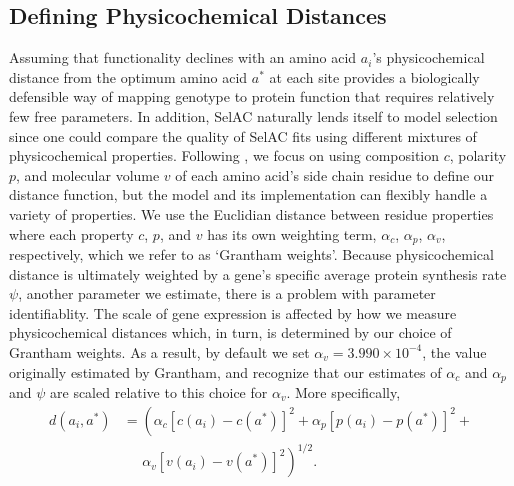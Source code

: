 \documentclass[onecolumn,letterpaper,fleqn,nogrid]{myMBE}%
\newcommand{\selac}{SelAC\xspace}
\newcommand{\alphac}{\ensuremath{\alpha_c}\xspace}
\newcommand{\alphap}{\ensuremath{\alpha_p}\xspace}
\newcommand{\alphav}{\ensuremath{\alpha_v}\xspace}
\newcommand{\aopt}{\ensuremath{a^*}\xspace}
\begin{document}
\subsection{Defining Physicochemical Distances}
Assuming that functionality declines with an amino acid $a_i$'s physicochemical distance from the optimum amino acid \aopt at each site provides a biologically defensible way of mapping genotype to protein function that requires relatively few free parameters.
In addition, \selac naturally lends itself to model selection since one could compare the quality of \selac fits using different mixtures of physicochemical properties.
Following \cite{Grantham1974}, we focus on using composition $c$, polarity $p$, and molecular volume $v$ of each amino acid's side chain residue to define our distance function, but the model and its implementation can flexibly handle a variety of properties.
We use the Euclidian distance between residue properties where each property $c$, $p$, and $v$ has its own weighting term, $\alphac$, $\alphap$, $\alphav$, respectively, which we refer to as `Grantham weights'.
Because physicochemical distance is ultimately weighted by a gene's specific average protein synthesis rate $\psi$, another parameter we estimate, there is a problem with parameter identifiablity.
The scale of gene expression is affected by how we measure physicochemical distances which, in turn, is determined by our choice of Grantham weights.
As a result, by default we set $\alphav = 3.990 \times 10^{-4}$, the value originally estimated by Grantham, and recognize that our estimates of $\alphac$ and $\alphap$ and $\psi$ are scaled relative to this choice for $\alphav$.
More specifically,
\begin{align*}
  d(a_i, \aopt) &= \left(\alphac \left[c\left(a_i\right) - c\left(\aopt\right)\right]^2 + \alphap \left[p\left(a_i\right) - p\left(\aopt\right)\right]^2 + \right.\\
  & \;\;\;\;\;\left. \alphav \left[v\left(a_i\right) - v\left(\aopt\right)\right]^2\right)^{1/2}.
\end{align*}
\end{document}

